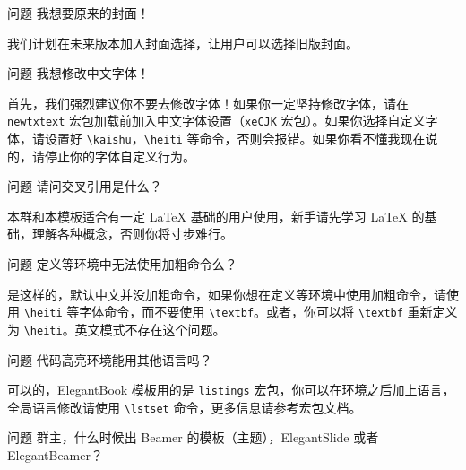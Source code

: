 	\begin{custom}{问题}
	我想要原来的封面！
	\end{custom}
	
	\begin{solution}
	我们计划在未来版本加入封面选择，让用户可以选择旧版封面。
	\end{solution}
	
	\begin{custom}{问题}
	我想修改中文字体！
	\end{custom}
	
	\begin{solution}
	首先，我们{\heiti 强烈建议你不要去修改字体}！如果你一定坚持修改字体，请在 \lstinline{newtxtext} 宏包加载前加入中文字体设置（\lstinline{xeCJK} 宏包）。如果你选择自定义字体，请设置好 \lstinline{\kaishu}，\lstinline{\heiti} 等命令，否则会报错。如果你看不懂我现在说的，请停止你的字体自定义行为。
	\end{solution}
	
	\begin{custom}{问题}
	请问交叉引用是什么？
	\end{custom}
	
	\begin{solution}
	本群和本模板适合有一定 \LaTeX{} 基础的用户使用，新手请先学习 \LaTeX{} 的基础，理解各种概念，否则你将寸步难行。
	\end{solution}
	
	\begin{custom}{问题}
	定义等环境中无法使用加粗命令么？
	\end{custom}
	
	\begin{solution}
	是这样的，默认中文并没加粗命令，如果你想在定义等环境中使用加粗命令，请使用 \lstinline{\heiti} 等字体命令，而不要使用 \lstinline{\textbf}。或者，你可以将 \lstinline{\textbf} 重新定义为 \lstinline{\heiti}。英文模式不存在这个问题。
	\end{solution}
	
	\begin{custom}{问题}
	代码高亮环境能用其他语言吗？
	\end{custom}
	
	\begin{solution}
	可以的，ElegantBook 模板用的是 \lstinline{listings} 宏包，你可以在环境之后加上语言，全局语言修改请使用 \lstinline{\lstset} 命令，更多信息请参考宏包文档。
	\end{solution}
	
	
	\begin{custom}{问题}
	群主，什么时候出 Beamer 的模板（主题），ElegantSlide 或者 ElegantBeamer？
	\end{custom}
	
